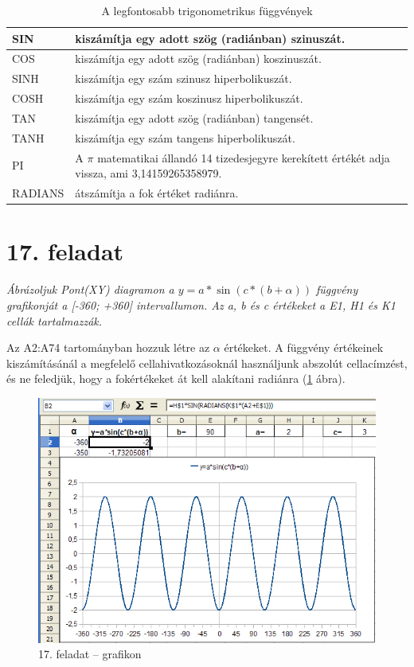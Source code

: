 \begin{table}
\begin{center}
\caption{A legfontosabb trigonometrikus függvények}\label{TrigFüggvények}
\begin{tabular}{|m{2.5cm}|m{8cm}|}
\hline
SIN &
 kiszámítja egy adott szög (radiánban) szinuszát.\\ \hline
COS &
 kiszámítja egy adott szög (radiánban) koszinuszát.\\ \hline
SINH &
 kiszámítja egy szám szinusz hiperbolikuszát.\\ \hline
COSH &
 kiszámítja egy szám koszinusz hiperbolikuszát.\\ \hline
TAN &
 kiszámítja egy adott szög (radiánban) tangensét.\\ \hline
TANH &
 kiszámítja egy szám tangens hiperbolikuszát.\\ \hline
PI &
 A ${\pi}$ matematikai állandó 14 tizedesjegyre kerekített
értékét adja vissza, ami 3,14159265358979.\\ \hline
RADIANS &
átszámítja a fok értéket radiánra.\\ \hline
\end{tabular}
\end{center}
\end{table}


\clearpage
\section{17. feladat}

{\itshape
Ábrázoljuk Pont(XY) diagramon a  $y=a\ast \sin (c\ast
(b+\mathit{{\alpha}}))$ függvény grafikonját a [-360; +360]
intervallumon.  Az a, b és c értékeket a E1, H1 és K1 cellák
tartalmazzák.}

Az A2:A74 tartományban hozzuk létre az ${\alpha}$ értékeket. A
függvény értékeinek kiszámításánál a megfelelő
cellahivatkozásoknál használjunk abszolút cellacímzést,
és ne feledjük, hogy a fokértékeket át kell alakítani
radiánra (\ref{17-feladatGrafikon} ábra).

\begin{figure}[!h]
\begin{center}
\includegraphics[width=15.529cm]{oocalcv1-img89.png}
\caption{17. feladat --  grafikon}\label{17-feladatGrafikon}
\end{center}
\end{figure}

